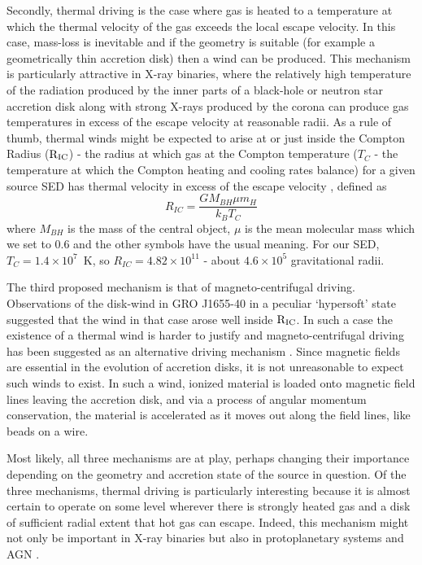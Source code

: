 \documentclass[a4paper,fleqn,usenatbib]{mnras}
\begin{document}
Secondly, thermal driving is the case where gas is heated to a temperature at which the thermal velocity of the 
gas exceeds
the local escape velocity. In this case, mass-loss is inevitable and if the geometry is suitable (for example a
geometrically thin accretion disk) then a wind can be produced. This mechanism is particularly attractive in 
X-ray binaries, where the relatively high temperature of the radiation produced by the inner parts of a black-hole or 
neutron star accretion disk along with strong X-rays produced by the corona can produce gas temperatures in excess
of the escape velocity at reasonable radii. As a rule of thumb, thermal winds might be expected
to arise at or just inside the Compton Radius ($\rm{R_{IC}}$) - the radius at which gas at the Compton temperature ($T_C$ - 
the temperature at which the Compton heating and cooling rates balance)
for a given source SED has thermal velocity in excess of the escape velocity \citep{1983ApJ...271...70B}, defined as
\begin{equation}
R_{IC}=\frac{GM_{BH}\mu m_H}{k_BT_C}
\end{equation}
where $M_{BH}$ is the mass of the central object, $\mu$ is the 
mean molecular mass which we set to 0.6 and the other symbols have the usual meaning. 
For our SED, $T_C=1.4\times10^7$~K, so $R_{IC}=4.82\times10^{11}$ - about $4.6\times10^5$ gravitational
radii.


 The third proposed mechanism is that of magneto-centrifugal driving. 
Observations of the disk-wind in GRO J1655-40 in a peculiar `hypersoft' state suggested that the wind in that
case arose well inside $\rm{R_{IC}}$. In such a case the existence of a thermal wind is harder to justify 
and magneto-centrifugal driving has been suggested as an alternative driving mechanism
\citep[but also see \citealt{2006ApJ...652L.117N,2015MNRAS.451..475U,2016ApJ...823..159S}]
{1992ApJS...80..753S,2006Natur.441..953M,2008ApJ...680.1359M,2009ApJ...701..865K}. Since
magnetic fields are essential in the evolution of accretion disks, it is not unreasonable to expect such winds to 
exist. In such a wind, ionized material is loaded onto magnetic field lines leaving the accretion disk, and via a process
of angular momentum conservation, the material is accelerated as it moves out along the field lines, like beads
on a wire.

Most likely, all three mechanisms are at play, perhaps changing their importance depending on the
geometry and accretion state of the source in question. Of the three mechanisms, thermal driving is 
particularly interesting because it is almost certain to 
operate on some level wherever there is strongly heated gas and a disk of sufficient radial extent that hot gas 
can escape. Indeed, this mechanism might not only be important in X-ray binaries but also in protoplanetary systems \cite[e.g.][]{2012MNRAS.422.1880O} and AGN \cite[e.g.][]{2018MNRAS.476.4395B}.
\end{document}
